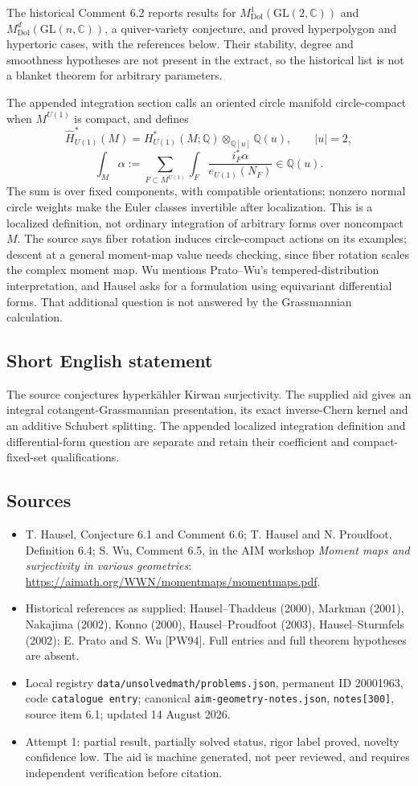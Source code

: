 \documentclass[11pt]{article}
\newcommand{\Q}{\mathbb{Q}}
\newcommand{\C}{\mathbb{C}}
\begin{document}
The historical Comment 6.2 reports results for \(M^1_{\mathrm{Dol}}(\mathrm{GL}(2,\C))\) and \(M^d_{\mathrm{Dol}}(\mathrm{GL}(n,\C))\), a quiver-variety conjecture, and proved hyperpolygon and hypertoric cases, with the references below. Their stability, degree and smoothness hypotheses are not present in the extract, so the historical list is not a blanket theorem for arbitrary parameters.

The appended integration section calls an oriented circle manifold circle-compact when \(M^{U(1)}\) is compact, and defines
\[
\widehat H_{U(1)}^*(M)=H_{U(1)}^*(M;\Q)\otimes_{\Q[u]}\Q(u),\qquad |u|=2,
\]
\[
\int_M\alpha:=\sum_{F\subset M^{U(1)}}\int_F
\frac{i_F^*\alpha}{e_{U(1)}(N_F)}\in\Q(u).
\]
The sum is over fixed components, with compatible orientations; nonzero normal circle weights make the Euler classes invertible after localization. This is a localized definition, not ordinary integration of arbitrary forms over noncompact \(M\). The source says fiber rotation induces circle-compact actions on its examples; descent at a general moment-map value needs checking, since fiber rotation scales the complex moment map. Wu mentions Prato--Wu's tempered-distribution interpretation, and Hausel asks for a formulation using equivariant differential forms. That additional question is not answered by the Grassmannian calculation.
\subsection{Short English statement}
The source conjectures hyperk\"ahler Kirwan surjectivity. The supplied aid gives an integral cotangent-Grassmannian presentation, its exact inverse-Chern kernel and an additive Schubert splitting. The appended localized integration definition and differential-form question are separate and retain their coefficient and compact-fixed-set qualifications.
\subsection{Sources}
\begin{itemize}
\item T. Hausel, Conjecture 6.1 and Comment 6.6; T. Hausel and N. Proudfoot, Definition 6.4; S. Wu, Comment 6.5, in the AIM workshop \emph{Moment maps and surjectivity in various geometries}: \url{https://aimath.org/WWN/momentmaps/momentmaps.pdf}.
\item Historical references as supplied: Hausel--Thaddeus (2000), Markman (2001), Nakajima (2002), Konno (2000), Hausel--Proudfoot (2003), Hausel--Sturmfels (2002); E. Prato and S. Wu [PW94]. Full entries and full theorem hypotheses are absent.
\item Local registry \texttt{data/unsolvedmath/problems.json}, permanent ID 20001963, code \texttt{catalogue entry}; canonical \texttt{aim-geometry-notes.json}, \texttt{notes[300]}, source item 6.1; updated 14 August 2026.
\item Attempt 1: partial result, partially solved status, rigor label proved, novelty confidence low. The aid is machine generated, not peer reviewed, and requires independent verification before citation.
\end{itemize}
\end{document}
